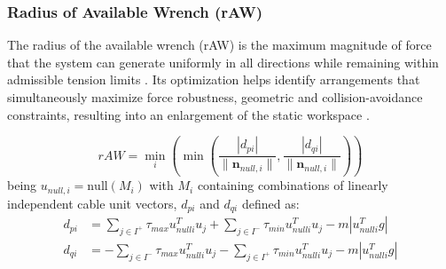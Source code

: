 
\subsubsection{Radius of Available Wrench (rAW)}
The radius of the available wrench (rAW) is the maximum magnitude of force that the system can generate uniformly in all directions while remaining within admissible tension limits \cite{jamshidifar_static_2020}. Its optimization helps identify arrangements that simultaneously maximize force robustness, geometric and collision-avoidance constraints, resulting into an enlargement of the static workspace \cite{jamshidifar_static_2020}.

\begin{equation}
    rAW = \min_i \left( \min \left(\frac{|d_{pi}|}{\|\mathbf{n}_{null, i} \|}, \frac{|d_{qi}|}{\|\mathbf{n}_{null, i} \|} \right)\right)
\label{eq:rAWforce}
\end{equation}
being $u_{null, i} = \text{null}(M_i)$ with $M_i$ containing combinations of linearly independent cable unit vectors, $d_{pi}$ and $d_{qi}$ defined as:
\begin{equation}
\begin{aligned}
        d_{pi} &= \sum_{j \in I^+} \tau_{max} u_{nulli}^T u_j + \sum_{j \in I^-} \tau_{min} u_{nulli}^T u_j - m |u_{nulli}^T g| \\
        d_{qi} &= -\sum_{j \in I^-} \tau_{max} u_{nulli}^T u_j - \sum_{j \in I^+} \tau_{min} u_{nulli}^T u_j - m |u_{nulli}^T g|
\end{aligned}
\end{equation}

